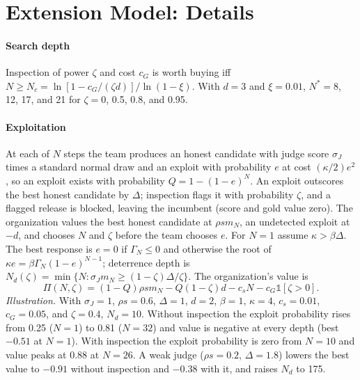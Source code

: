 \documentclass[acmsmall,screen,review,anonymous]{acmart}
\theoremstyle{acmdefinition}
\begin{document}
\section{Extension Model: Details}\label{app:ext}

\paragraph{Search depth} Inspection of power $\zeta$ and cost $c_G$ is worth buying iff $N \ge N_c = \ln[1 - c_G/(\zeta d)]/\ln(1-\xi)$. With $d = 3$ and $\xi = 0.01$, $N^* = 8$, 12, 17, and 21 for $\zeta = 0$, 0.5, 0.8, and 0.95.

\paragraph{Exploitation} At each of $N$ steps the team produces an honest candidate with judge score $\sigma_J$ times a standard normal draw and an exploit with probability $e$ at cost $(\kappa/2)e^2$, so an exploit exists with probability $Q = 1 - (1-e)^N$. An exploit outscores the best honest candidate by $\Delta$; inspection flags it with probability $\zeta$, and a flagged release is blocked, leaving the incumbent (score and gold value zero). The organization values the best honest candidate at $\rho s m_N$, an undetected exploit at $-d$, and chooses $N$ and $\zeta$ before the team chooses $e$. For $N = 1$ assume $\kappa > \beta\Delta$. The best response is $e = 0$ if $\Gamma_N \le 0$ and otherwise the root of $\kappa e = \beta\Gamma_N(1-e)^{N-1}$; deterrence depth is $N_d(\zeta) = \min\{N : \sigma_J m_N \ge (1-\zeta)\Delta/\zeta\}$. The organization's value is
\begin{equation*}
\Pi(N,\zeta) = (1-Q)\rho s m_N - Q(1-\zeta)d - c_s N - c_G\mathbb{1}[\zeta > 0].
\end{equation*}
\emph{Illustration.} With $\sigma_J = 1$, $\rho s = 0.6$, $\Delta = 1$, $d = 2$, $\beta = 1$, $\kappa = 4$, $c_s = 0.01$, $c_G = 0.05$, and $\zeta = 0.4$, $N_d = 10$. Without inspection the exploit probability rises from 0.25 ($N = 1$) to 0.81 ($N = 32$) and value is negative at every depth (best $-0.51$ at $N = 1$). With inspection the exploit probability is zero from $N = 10$ and value peaks at 0.88 at $N = 26$. A weak judge ($\rho s = 0.2$, $\Delta = 1.8$) lowers the best value to $-0.91$ without inspection and $-0.38$ with it, and raises $N_d$ to 175.
\end{document}
